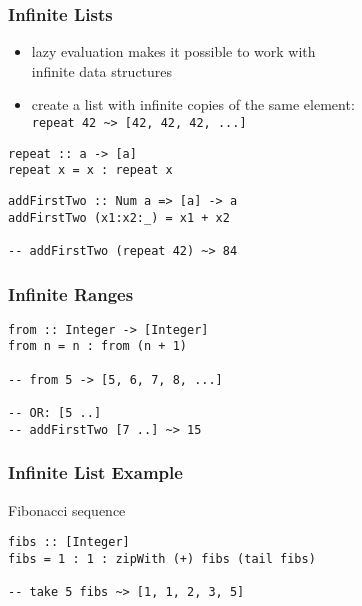 \documentclass[dvipsnames]{beamer}
\theoremstyle{plain}
\begin{document}
\begin{frame}[fragile]
  \frametitle{Infinite Lists}

  \begin{itemize}
    \item lazy evaluation makes it possible to work with\\
      infinite data structures
    \item create a list with infinite copies of the same element:\\
      \lstinline|repeat 42 ~> [42, 42, 42, ...]|
  \end{itemize}

  \begin{exampleblock}{}
    \begin{lstlisting}[deletekeywords={repeat}]
repeat :: a -> [a]
repeat x = x : repeat x
    \end{lstlisting}

    \pause
    \medskip
    \begin{lstlisting}
addFirstTwo :: Num a => [a] -> a
addFirstTwo (x1:x2:_) = x1 + x2

-- addFirstTwo (repeat 42) ~> 84
    \end{lstlisting}
  \end{exampleblock}
\end{frame}

\begin{frame}[fragile]
  \frametitle{Infinite Ranges}

  \begin{lstlisting}
from :: Integer -> [Integer]
from n = n : from (n + 1)

-- from 5 -> [5, 6, 7, 8, ...]

-- OR: [5 ..]
-- addFirstTwo [7 ..] ~> 15
  \end{lstlisting}
\end{frame}

\begin{frame}[fragile]
  \frametitle{Infinite List Example}

  \begin{exampleblock}{Fibonacci sequence}
    \begin{lstlisting}
fibs :: [Integer]
fibs = 1 : 1 : zipWith (+) fibs (tail fibs)

-- take 5 fibs ~> [1, 1, 2, 3, 5]
    \end{lstlisting}


  \end{exampleblock}
\end{frame}
\end{document}
